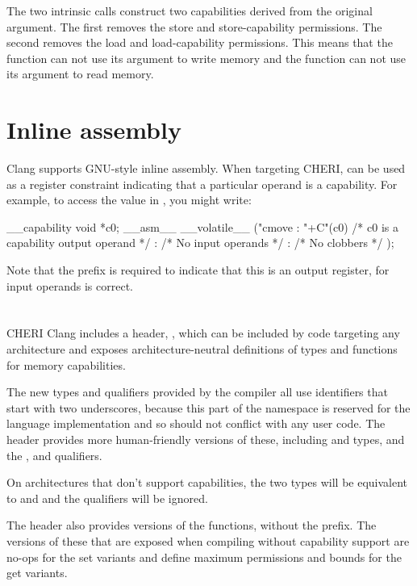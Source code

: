 The two intrinsic calls construct two capabilities derived from the original argument.
The first removes the store and store-capability permissions.
The second removes the load and load-capability permissions.
This means that the  function can not use its argument to write memory and the  function can not use its argument to read memory.

\section{Inline assembly}

Clang supports GNU-style inline assembly.
When targeting CHERI,  can be used as a register constraint indicating that a particular operand is a capability.
For example, to access the value in , you might write:

\begin{csnippet}
__capability void *c0;
__asm__ __volatile__ ("cmove %
	: "+C"(c0) /* c0 is a capability output operand */
	: /* No input operands */
	: /* No clobbers */
	);
\end{csnippet}

Note that the \ccode{+} prefix is required to indicate that this is an output register, for input operands  is correct.

\section{}

CHERI Clang includes a header, , which can be included by code targeting any architecture and exposes architecture-neutral definitions of types and functions for memory capabilities.

The new types and qualifiers provided by the compiler all use identifiers that start with two underscores, because this part of the namespace is reserved for the language implementation and so should not conflict with any user code.
The  header provides more human-friendly versions of these, including  and  types, and the ,  and  qualifiers.

On architectures that don't support capabilities, the two types will be equivalent to  and  and the qualifiers will be ignored.

The header also provides versions of the  functions, without the  prefix.
The versions of these that are exposed when compiling without capability support are no-ops for the set variants and define maximum permissions and bounds for the get variants.

